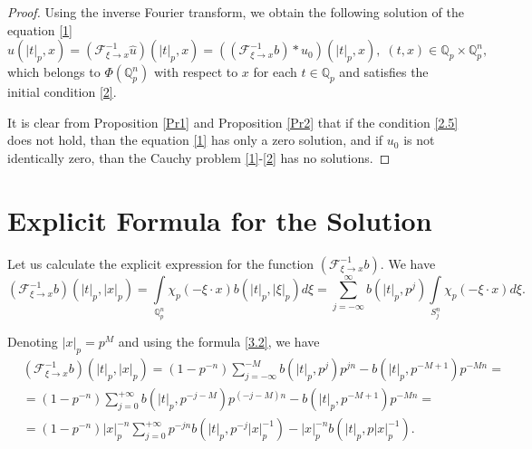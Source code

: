 \documentclass[14pt]{article}
\theoremstyle{theorem}
\theoremstyle{theorem}
\theoremstyle{definition}
\theoremstyle{lemma}
\newcommand{\Label}[1]{\label{#1}}
\numberwithin{equation}{section}
\begin{document}
\begin{proof}
Using the inverse Fourier transform, we obtain the following solution of the equation \eqref{1}
\begin{equation}\Label{17}
u(|t|_p,x)=(\mathcal{F}_{\xi\to x}^{-1}\hat{u})(|t|_p,x)=\left((\mathcal{F}_{\xi\to x}^{-1}b)\ast u_0\right)(|t|_p,x),\;(t,x)\in\mathbb{Q}_p\times\mathbb{Q}_p^n,
\end{equation}
which belongs to $\Phi(\mathbb{Q}_p^n)$ with respect to $x$ for each $t\in\mathbb{Q}_p$ and satisfies the initial condition \eqref{2}.

It is clear from Proposition \ref{Pr1} and Proposition \ref{Pr2} that if the condition \eqref{2.5} does not hold, than the equation \eqref{1} has only a zero solution, and if $u_0$ is not identically zero, than the Cauchy problem \eqref{1}-\eqref{2} has no solutions.

\end{proof}

\section{Explicit Formula for the Solution}

Let us calculate the explicit expression for the function $(\mathcal{F}_{\xi\to x}^{-1}b)$. We have
\begin{equation}\Label{18'}
(\mathcal{F}_{\xi\to x}^{-1}b)(|t|_p,|x|_p)=\int\limits_{\mathbb{Q}_p^n}\chi_p(-\xi\cdot x)b(|t|_p,|\xi|_p)d\xi=\sum\limits_{j=-\infty}^{\infty}b(|t|_p,p^j)\int\limits_{S_j^n}\chi_p(-\xi\cdot x)d\xi.
\end{equation}

Denoting $|x|_p=p^M$ and using the formula \eqref{3.2}, we have
\begin{equation}\Label{18}
\begin{split}
&(\mathcal{F}_{\xi\to x}^{-1}b)(|t|_p,|x|_p)=(1-p^{-n})\sum\limits_{j=-\infty}^{-M}b(|t|_p,p^j)p^{jn}-b(|t|_p,p^{-M+1})p^{-Mn}=\\
&=(1-p^{-n})\sum\limits_{j=0}^{+\infty}b(|t|_p,p^{-j-M})p^{(-j-M)n}-b(|t|_p,p^{-M+1})p^{-Mn}=\\
&=(1-p^{-n})|x|_p^{-n}\sum\limits_{j=0}^{+\infty}p^{-jn}b(|t|_p,p^{-j}|x|_p^{-1})-|x|_p^{-n}b(|t|_p,p|x|_p^{-1}).
\end{split}
\end{equation}
\end{document}

